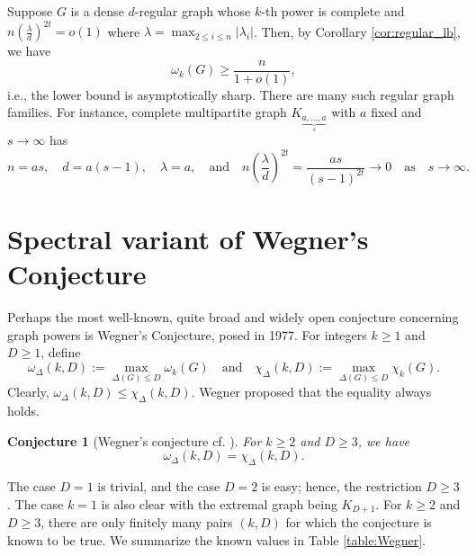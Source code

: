 \documentclass[10pt,a4paper]{article}
\theoremstyle{plain}
\newtheorem{conjecture}[theorem]{Conjecture}
\numberwithin{equation}{section}
\begin{document}
Suppose $G$ is a dense $d$-regular graph whose $k$-th power is complete and $n\left(\frac{\lambda}{d}\right)^{2t} = o(1)$ where $\lambda = \max_{2\le i\le n} |\lambda_i|$. Then, by Corollary \ref{cor:regular_lb}, we have 
\[\omega_k(G)\ge \frac{n}{1 + o(1)}, \]
i.e., the lower bound is asymptotically sharp. There are many such regular graph families. For instance, complete multipartite graph $K_{\underbrace{a, \ldots, a}_{s}}$ with $a$ fixed and $s\to \infty$ has 
\[n = as, \quad d = a(s-1), \quad \lambda = a, \quad \text{and}\quad n\left(\frac{\lambda}{d}\right)^{2t} = \frac{as}{(s-1)^{2t}}\to 0\quad \text{as} \quad s\to \infty.\]  

\section{Spectral variant of Wegner's Conjecture}\label{sec:Wegner}


Perhaps the most well-known, quite broad and widely open conjecture concerning graph powers is Wegner's Conjecture, posed in 1977. For integers $k\ge 1$ and $D\ge 1$, define 
\[ \omega_\Delta(k,D):=\max_{\Delta(G)\le D}\omega_k(G) \quad \text{and}\quad \chi_\Delta(k,D) :=\max_{\Delta(G)\le D}\chi_k(G).\]
Clearly, $\omega_\Delta(k,D)\le \chi_\Delta(k,D)$. Wegner proposed that the equality always holds. 

\begin{conjecture}[Wegner's conjecture \cite{Wegner_1977} cf. \cite{Cranston_2023}]\label{conj:Wegner} For $k\ge 2$ and $D\ge 3$, we have 
\[  \omega_\Delta(k,D) =\chi_\Delta(k,D).\]
\end{conjecture}

The case $D=1$ is trivial, and the case $D=2$ is easy; hence, the restriction $D\ge 3$. The case $k=1$ is also clear with the extremal graph being $K_{D+1}$. For $k\ge 2$ and $D\ge 3$, there are only finitely many pairs $(k, D)$ for which the conjecture is known to be true. We summarize the known values in Table \ref{table:Wegner}. 
\end{document}
